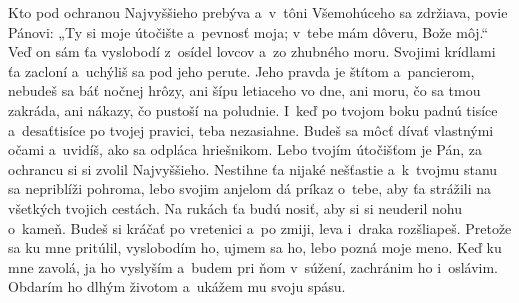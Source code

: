 Kto pod ochranou Najvyššieho prebýva
a~v~tôni Všemohúceho sa zdržiava,
\versseparator
povie Pánovi: „Ty si moje útočište
a~pevnosť moja; v~tebe mám dôveru, Bože môj.“
\versseparator
Veď on sám ťa vyslobodí z~osídel lovcov
a~zo zhubného moru.
\versseparator
Svojimi krídlami ťa zacloní
a~uchýliš sa pod jeho perute.
\versseparator
Jeho pravda je štítom a~pancierom,
nebudeš sa báť nočnej hrôzy,
\versseparator
ani šípu letiaceho vo dne,
ani moru, čo sa tmou zakráda,
ani nákazy, čo pustoší na poludnie.
\versseparator
 I~keď po tvojom boku padnú tisíce
a~desaťtisíce po tvojej pravici,
teba nezasiahne.
\versseparator
Budeš sa môcť dívať vlastnými očami
a~uvidíš, ako sa odpláca hriešnikom.
\versseparator
Lebo tvojím útočišťom je Pán,
za ochrancu si si zvolil Najvyššieho.
\versseparator
Nestihne ťa nijaké nešťastie
a~k~tvojmu stanu sa nepriblíži pohroma,
\versseparator
lebo svojim anjelom dá príkaz o~tebe,
aby ťa strážili na všetkých tvojich cestách.
\versseparator
Na rukách ťa budú nosiť,
aby si si neuderil nohu o~kameň.
\versseparator
Budeš si kráčať po vretenici a~po zmiji,
leva i~draka rozšliapeš.
\versseparator
Pretože sa ku mne pritúlil, vyslobodím ho,
ujmem sa ho, lebo pozná moje meno.
\versseparator
Keď ku mne zavolá, ja ho vyslyším
a~budem pri ňom v~súžení,
zachránim ho i~oslávim.
\versseparator
Obdarím ho dlhým životom
a~ukážem mu svoju spásu.
